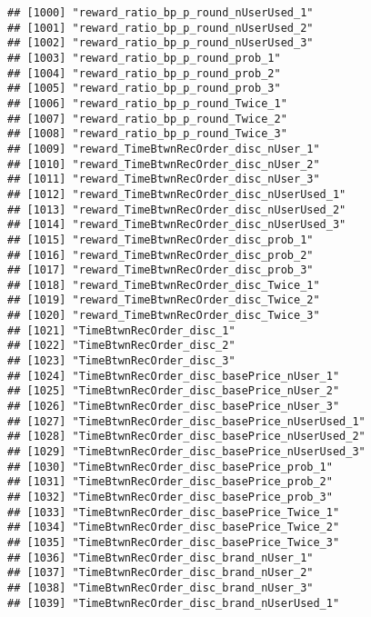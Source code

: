 \documentclass[10pt]{report}
\begin{document}
\begin{verbatim}
## [1000] "reward_ratio_bp_p_round_nUserUsed_1"                  
## [1001] "reward_ratio_bp_p_round_nUserUsed_2"                  
## [1002] "reward_ratio_bp_p_round_nUserUsed_3"                  
## [1003] "reward_ratio_bp_p_round_prob_1"                       
## [1004] "reward_ratio_bp_p_round_prob_2"                       
## [1005] "reward_ratio_bp_p_round_prob_3"                       
## [1006] "reward_ratio_bp_p_round_Twice_1"                      
## [1007] "reward_ratio_bp_p_round_Twice_2"                      
## [1008] "reward_ratio_bp_p_round_Twice_3"                      
## [1009] "reward_TimeBtwnRecOrder_disc_nUser_1"                 
## [1010] "reward_TimeBtwnRecOrder_disc_nUser_2"                 
## [1011] "reward_TimeBtwnRecOrder_disc_nUser_3"                 
## [1012] "reward_TimeBtwnRecOrder_disc_nUserUsed_1"             
## [1013] "reward_TimeBtwnRecOrder_disc_nUserUsed_2"             
## [1014] "reward_TimeBtwnRecOrder_disc_nUserUsed_3"             
## [1015] "reward_TimeBtwnRecOrder_disc_prob_1"                  
## [1016] "reward_TimeBtwnRecOrder_disc_prob_2"                  
## [1017] "reward_TimeBtwnRecOrder_disc_prob_3"                  
## [1018] "reward_TimeBtwnRecOrder_disc_Twice_1"                 
## [1019] "reward_TimeBtwnRecOrder_disc_Twice_2"                 
## [1020] "reward_TimeBtwnRecOrder_disc_Twice_3"                 
## [1021] "TimeBtwnRecOrder_disc_1"                              
## [1022] "TimeBtwnRecOrder_disc_2"                              
## [1023] "TimeBtwnRecOrder_disc_3"                              
## [1024] "TimeBtwnRecOrder_disc_basePrice_nUser_1"              
## [1025] "TimeBtwnRecOrder_disc_basePrice_nUser_2"              
## [1026] "TimeBtwnRecOrder_disc_basePrice_nUser_3"              
## [1027] "TimeBtwnRecOrder_disc_basePrice_nUserUsed_1"          
## [1028] "TimeBtwnRecOrder_disc_basePrice_nUserUsed_2"          
## [1029] "TimeBtwnRecOrder_disc_basePrice_nUserUsed_3"          
## [1030] "TimeBtwnRecOrder_disc_basePrice_prob_1"               
## [1031] "TimeBtwnRecOrder_disc_basePrice_prob_2"               
## [1032] "TimeBtwnRecOrder_disc_basePrice_prob_3"               
## [1033] "TimeBtwnRecOrder_disc_basePrice_Twice_1"              
## [1034] "TimeBtwnRecOrder_disc_basePrice_Twice_2"              
## [1035] "TimeBtwnRecOrder_disc_basePrice_Twice_3"              
## [1036] "TimeBtwnRecOrder_disc_brand_nUser_1"                  
## [1037] "TimeBtwnRecOrder_disc_brand_nUser_2"                  
## [1038] "TimeBtwnRecOrder_disc_brand_nUser_3"                  
## [1039] "TimeBtwnRecOrder_disc_brand_nUserUsed_1"              

\end{verbatim}
\end{document}
